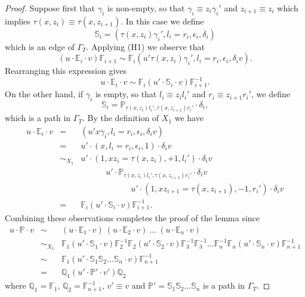 \documentclass[11pt]{amsart}
\theoremstyle{plain}
\begin{document}
\begin{proof}
Suppose first that $\gamma_i$ is non-empty, so that $\gamma_i \equiv z_i \gamma_i'$ and $z_{i+1} \equiv z_i$ which implies $\tau(x,z_i) \equiv \tau(x,z_{i+1})$. In this case we define
\[
{\mathbb{S}}_i = (\tau(x,z_i) \gamma_i', l_i = r_i, \epsilon_i, \delta_i  )
\]
which is an edge of $\Gamma_T$. Applying (H1) we observe that
\[
(u \cdot {\mathbb{E}}_i \cdot v) {\mathbb{F}}_{i+1} \sim {\mathbb{F}}_i (u'\tau(x,z_i) \gamma_i', l_i = r_i, \epsilon_i, \delta_i v ).
\]
Rearranging this expression gives
\[
u \cdot {\mathbb{E}}_i \cdot v \sim {\mathbb{F}}_i (u' \cdot {\mathbb{S}}_i \cdot v) {\mathbb{F}}_{i+1}^{-1}.
\]
On the other hand, if $\gamma_i$ is empty, so that $l_i \equiv z_i l_i'$ and $r_i \equiv z_{i+1} r_i'$, we define
\[
{\mathbb{S}}_i = {\mathbb{P}}_{\tau(x,z_i)l_i', \tau(x,z_{i+1})r_i'} \cdot \delta_i,
\]
which is a path in $\Gamma_T$. By the definition of $X_1$ we have 
$$
\begin{array}{rcl}
u \cdot {\mathbb{E}}_i \cdot v & = & (u'x \gamma_i, l_i = r_i, \epsilon_i, \delta_i v) \\
& = &  u' \cdot (x, l_i = r_i, \epsilon_i, 1) \cdot \delta_i v \\
& \sim_{X_1} & u' \cdot (1, x z_i = \tau(x, z_i), +1, l_i') \cdot \delta_i v  \\
& & \quad \quad  \quad  u' \cdot {\mathbb{P}}_{\tau(x, z_i)l_i', \tau(x,z_{i+1}) r_i'} \cdot \delta_i v  \\
& & \quad \quad  \quad  \quad \quad  \quad  u' \cdot (1, x z_{i+1} = \tau(x,z_{i+1}) , -1, r_i') \cdot \delta_i v \\
& = & {\mathbb{F}}_i (u' \cdot {\mathbb{S}}_i \cdot v) {\mathbb{F}}_{i+1}^{-1}.
\end{array}
$$
Combining these observations completes the proof of the lemma since 
$$
\begin{array}{rcl}
u \cdot {\mathbb{P}} \cdot v & \sim &
(u \cdot {\mathbb{E}}_1 \cdot v) \ (u \cdot {\mathbb{E}}_2 \cdot v) \ \ldots \ (u \cdot {\mathbb{E}}_{n} \cdot v) \\
& \sim_{X_1} & 	
		{\mathbb{F}}_1 (u' \cdot {\mathbb{S}}_1 \cdot v) {\mathbb{F}}_2^{-1} 
        {\mathbb{F}}_2 (u' \cdot {\mathbb{S}}_2 \cdot v) {\mathbb{F}}_3^{-1} {\mathbb{F}}_3^{-1} \ldots
		{\mathbb{F}}_n^{-1} {\mathbb{F}}_n (u' \cdot {\mathbb{S}}_n \cdot v) {\mathbb{F}}_{n+1}^{-1} \\
& \sim & {\mathbb{F}}_1  (u' \cdot {\mathbb{S}}_1 {\mathbb{S}}_2 \ldots {\mathbb{S}}_n \cdot v)  {\mathbb{F}}_{n+1}^{-1} \\
& = & {\mathbb{Q}}_1  (u' \cdot {\mathbb{P}}' \cdot v')  {\mathbb{Q}}_2
\end{array}
$$
where ${\mathbb{Q}}_1 = {\mathbb{F}}_1$, ${\mathbb{Q}}_2 = {\mathbb{F}}_{n+1}^{-1}$, $v' \equiv v$ and ${\mathbb{P}}' = {\mathbb{S}}_1 {\mathbb{S}}_2 \ldots {\mathbb{S}}_n$ is a path in $\Gamma_T$.\end{proof}
\end{document}
